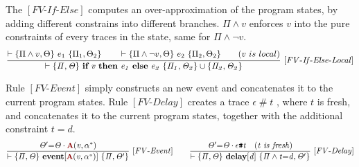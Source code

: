 \documentclass[acmsmall,10pt,review]{acmart}
\newcommand{\anyevent}[1]{{\textcolor{darkred}
{{\textbf{\small #1}}}}}
\newcommand{\code}[1]{{\tt{\ensuremath{\m{#1}}}}}
\newcommand{\m}{\mathit}
\newcommand{\mysharp}{{\mathrel{\texttt{\#}}}}
\begin{document}
{\vspace{1mm}
The \code{[FV\text{-}If\text{-}Else]} computes an 
over-approximation of the program states, by adding different constrains into 
different branches. \code{\Pi \wedge v} enforces 
\code{v} into the pure constraints of every traces in the state, same 
for \code{\Pi \wedge \neg v }.
{{\small\begin{gather*}
  \code{\frac{ 
    \begin{matrix}
\vdash \{ \Pi \wedge v, \Theta    \} \ e_1 \ \{  \Pi_1, \Theta_2 \} 
\qquad 
\vdash \{ \Pi \wedge \neg v , \Theta  \} \ e_2 \ 
\{  \Pi_2, \Theta_2 \}  
\qquad (v\ is\ local)
\end{matrix}}
  {\vdash \s{ \Pi, \Theta}\  \textbf{if}\ v\ \textbf{then}\ e_1\ 
  \textbf{else}\ e_2 \ \s{ \Pi_1, \Theta_2} \cup \s{\Pi_2, \Theta_2} } \  
  {[FV\text{-}If\text{-}Else\text{-}Local]}} 
  \end{gather*}}}


\vspace{1mm}
Rule \code{[FV\text{-}Event]} simply constructs an new event and 
concatenates it to the current program states. 
Rule \code{[FV\text{-}Delay]} creates a trace \code{\epsilon\mysharp t}
, where \code{t} is fresh, and concatenates it to the current program states, 
together with the additional constraint \code{t{=}d}. 
  {{\small\begin{gather*}
  \code{\frac{
    \Theta^\prime {=} \Theta\cdot \anyevent{A}(v, \alpha^*) 
    }
  {\vdash \s{ \Pi, \Theta} \  
  \textbf{event} [\anyevent{A}(v, \alpha^*)] 
   \ \{\Pi, \Theta^\prime \}} \   {[FV\text{-}Event]}} 
   \qquad
  \code{\frac{
    \Theta^\prime {=} \Theta\cdot \epsilon\mysharp t \quad (t\ is\ fresh) 
    }
  {\vdash \s{ \Pi, \Theta} \  
  \textbf{delay} [d] 
   \ \{ \Pi \wedge  t {=}d,  \Theta^\prime \}} \   {[FV\text{-}Delay]}} 
\end{gather*}}}


}
\end{document}
